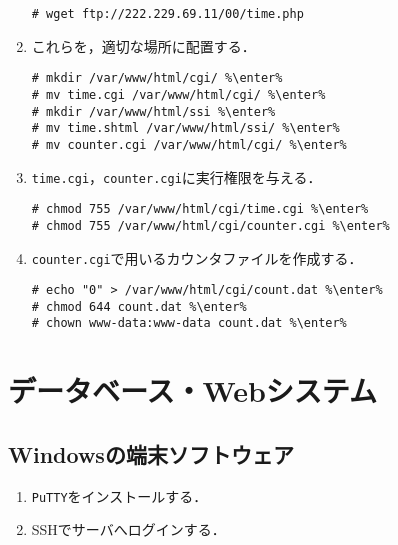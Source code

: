 \documentclass{jlreq}
\begin{document}
\begin{enumerate}
\begin{lstlisting}
# wget ftp://222.229.69.11/00/time.php
\end{lstlisting}
    \item これらを，適切な場所に配置する．
          \begin{lstlisting}
# mkdir /var/www/html/cgi/ %\enter%
# mv time.cgi /var/www/html/cgi/ %\enter%
# mkdir /var/www/html/ssi %\enter%
# mv time.shtml /var/www/html/ssi/ %\enter%
# mv counter.cgi /var/www/html/cgi/ %\enter%
\end{lstlisting}
    \item \texttt{time.cgi}，\texttt{counter.cgi}に実行権限を与える．
          \begin{lstlisting}
# chmod 755 /var/www/html/cgi/time.cgi %\enter%
# chmod 755 /var/www/html/cgi/counter.cgi %\enter%
\end{lstlisting}
    \item \texttt{counter.cgi}で用いるカウンタファイルを作成する．
          \begin{lstlisting}
# echo "0" > /var/www/html/cgi/count.dat %\enter%
# chmod 644 count.dat %\enter%
# chown www-data:www-data count.dat %\enter%
\end{lstlisting}
\end{enumerate}
\section{データベース・Webシステム}
\subsection{Windowsの端末ソフトウェア}
\begin{enumerate}
    \item \texttt{PuTTY}をインストールする．
    \item SSHでサーバへログインする．
\end{enumerate}
\end{document}
